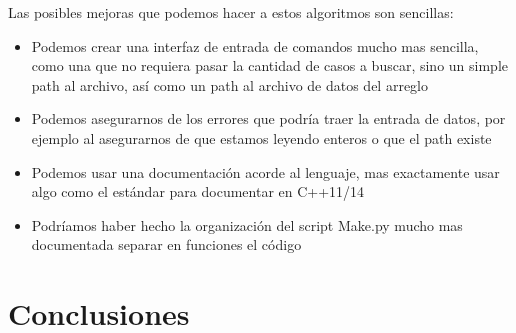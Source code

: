 \documentclass[12pt, fleqn]{article}                             %
\theoremstyle{break}                                            %
\begin{document}
    Las posibles mejoras que podemos hacer a estos algoritmos son sencillas:

    \begin{itemize}
        \item 
            Podemos crear una interfaz de entrada de comandos mucho mas sencilla, como
            una que no requiera pasar la cantidad de casos a buscar, sino un simple
            path al archivo, así como un path al archivo de datos del arreglo

        \item
            Podemos asegurarnos de los errores que podría traer la entrada de datos,
            por ejemplo al asegurarnos de que estamos leyendo enteros o que el path
            existe

        \item
            Podemos usar una documentación acorde al lenguaje, mas exactamente usar algo
            como el estándar para documentar en C++11/14

        \item
            Podríamos haber hecho la organización del script Make.py mucho mas documentada
            separar en funciones el código
    \end{itemize}

\clearpage
\section{Conclusiones}
\end{document}
